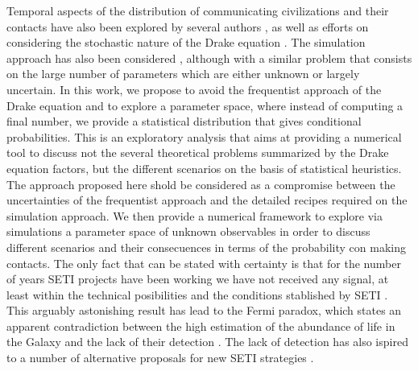 \Fpagebreak


Temporal aspects of the distribution of communicating civilizations
and their contacts have also been explored by several authors
\citep{fogg_temporal_1987, forgan_spatiotemporal_2011,
balbi_impact_2018, balb_spatiotemporal_2018, horvat_impact_2011},
%
as well as efforts on considering the stochastic nature of the Drake
equation \citep{glade_stochastic_2011}.
%
The simulation approach has also been considered
\citep{forgan_evaluating_2015, vukotic_grandeur_2016,
murante_simulating_2015, forgan_numerical_2009, forgan_galactic_2017},
although with a similar problem that consists on the large number of
parameters which are either unknown or largely uncertain.
%
%
%
In this work, we propose to avoid the frequentist approach of the
Drake equation and to explore a parameter space, where instead of
computing a final number, we provide a statistical distribution that
gives conditional probabilities.
%
This is an exploratory analysis that aims at providing a numerical
tool to discuss not the several theoretical problems summarized by the
Drake equation factors, but the different scenarios on the basis of
statistical heuristics.
%
The approach proposed here shold be considered as a compromise between
the uncertainties of the frequentist approach and the detailed recipes
required on the simulation approach.
%
We then provide a numerical framework to explore via simulations a
parameter space of unknown observables in order to discuss different
scenarios and their consecuences in terms of the probability con
making contacts.
%
The only fact that can be stated with certainty is that for the number
of years SETI projects have been working we have not received any
signal, at least within the technical posibilities and the conditions
stablished by SETI \citep{tarter_search_2001}.
%
This arguably astonishing result has lead to the Fermi paradox, which
states an apparent contradiction between the high estimation of the
abundance of life in the Galaxy and the lack of their detection
\citep{vanhouten_isthere_2017}.
%
The lack of detection has also ispired to a number of alternative
proposals for new SETI strategies \citep{forgan_exoplanet_2017,
balbi_impact_2018, loeb_eavesdropping_2006, maccone_KLT_2010,
tarter_advancing_2009, enriquez_breakthrough_2017, loeb_relative_2016,
maccone_SETI_2011,  lingam_relative_2019, wright_theGsearch_2015,
maccone_SETI_2013, maccone_lognormals_2014, harp_application_2018,
forgan_possibility_2013, forgan_galactic_2017, funes_searching_2019}.
 


